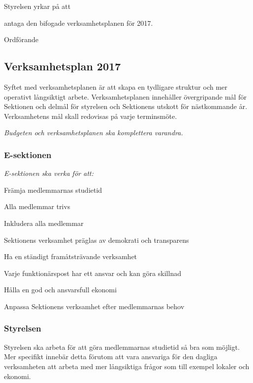 \documentclass[../_main/handlingar.tex]{subfiles}
\begin{document}

Styrelsen yrkar på att

\begin{attsatser}
    \att antaga den bifogade verksamhetsplanen för 2017.
\end{attsatser}

\begin{signatures}{1}
    \ist
    \signature{\ordf}{Ordförande}
\end{signatures}

\subsection*{Verksamhetsplan 2017}

Syftet med verksamhetsplanen är att skapa en tydligare struktur och mer operativt långsiktigt arbete. Verksamhetsplanen innehåller övergripande mål för Sektionen och delmål för styrelsen och Sektionens utskott för nästkommande år. Verksamhetens mål skall redovisas på varje terminsmöte.

\emph{Budgeten och verksamhetsplanen ska komplettera varandra.}

\subsubsection*{E-sektionen}
\emph{E-sektionen ska verka för att:}
\begin{dashlist}
    \item Främja medlemmarnas studietid
    \item Alla medlemmar trivs
    \item Inkludera alla medlemmar
    \item Sektionens verksamhet präglas av demokrati och transparens
    \item Ha en ständigt framåtsträvande verksamhet
    \item Varje funktionärspost har ett ansvar och kan göra skillnad
    \item Hålla en god och ansvarsfull ekonomi
    \item Anpassa Sektionens verksamhet efter medlemmarnas behov
\end{dashlist}

\subsubsection*{Styrelsen}
Styrelsen ska arbeta för att göra medlemmarnas studietid så bra som möjligt. Mer specifikt innebär detta förutom att vara ansvariga för den dagliga verksamheten att arbeta med mer långsiktiga frågor som till exempel lokaler och ekonomi.
\end{document}
